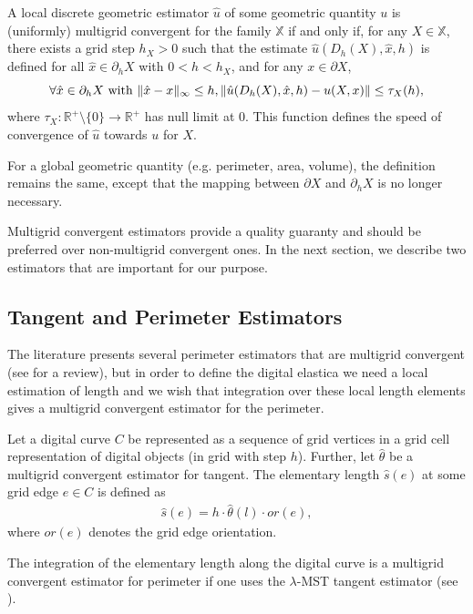 \documentclass[runningheads]{llncs}
\DeclarePairedDelimiter\norm{\lVert}{\rVert}%
\begin{document}
\begin{definition}
  A local discrete geometric estimator $\hat{u}$ of some geometric
  quantity $u$ is (uniformly) multigrid convergent for the family $\mathbb{X}$ if
  and only if, for any $X \in \mathbb{X}$, there exists a grid step
  $h_X>0$ such that the estimate $\hat{u}(D_h(X),\hat{x},h)$ is
  defined for all $\hat{x} \in \partial_hX$ with $ 0 < h < h_X$, and
  for any $x \in \partial X$,
  \begin{equation*}
    \forall \hat{x} \in  \partial_hX \text{ with } \norm{ \hat{x} - x }_{\infty} \leq h, \norm{ \hat{u}(D_h(X),\hat{x},h) - u(X,x)} \leq \tau_{X}(h),			
  \end{equation*}
  where $\tau_{X}:\mathbb{R}^{+}\setminus\{0\} \rightarrow
  \mathbb{R}^{+}$ has null limit at $0$. This function defines the
  speed of convergence of $\hat{u}$ towards $u$ for $X$.
\end{definition}
	
For a global geometric quantity (e.g. perimeter, area, volume), the definition remains the same, except that the mapping
between $\partial X$ and $\partial_h X$ is no longer necessary.
	
Multigrid convergent estimators provide a quality guaranty and should be preferred over non-multigrid convergent
ones. In the next section, we describe two estimators that are important for our purpose.

\subsection{Tangent and Perimeter Estimators}

The literature presents several perimeter estimators that are multigrid convergent (see
\cite{coeurjolly04,coeurjolly12} for a review), but in order to define the digital elastica we need a local estimation
of length and we wish that integration over these local length elements gives a multigrid convergent estimator for the
perimeter.

\begin{definition}
  Let a digital curve $C$ be represented as a sequence of grid vertices in a grid cell representation of digital objects (in grid with step $h$). Further, let $\hat{\theta}$ be a multigrid convergent estimator for tangent. The elementary length $\hat{s}(e)$ at some grid edge $e\in C$ is defined as
  \begin{align*}
    \hat{s}(e) = h \cdot \hat{\theta}(l) \cdot or(e),
  \end{align*}
  where $or(e)$ denotes the grid edge orientation.
\end{definition}
The integration of the elementary length along the digital curve is a multigrid convergent estimator for perimeter if
one uses the $\lambda$-MST \cite{lachaud07} tangent estimator (see \cite{lachaud06}).
\end{document}
